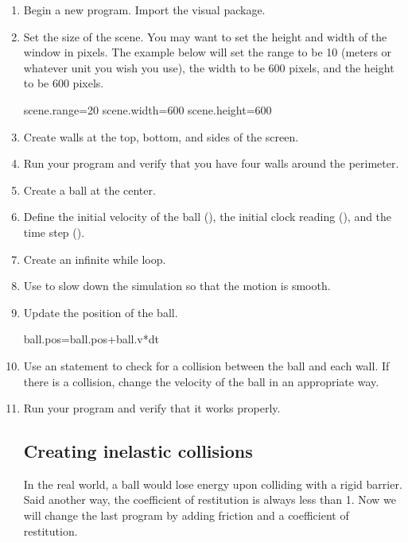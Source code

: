 \begin{enumerate}
\item Begin a new program. Import the visual package.

\item Set the size of the scene. You may want to set the height and width of the window in pixels. The example below will set the range to be 10 (meters or whatever unit you wish you use), the width to be 600 pixels, and the height to be 600 pixels.

\begin{myvpython}
scene.range=20
scene.width=600
scene.height=600
\end{myvpython}

\item Create walls at the top, bottom, and sides of the screen.

\item Run your program and verify that you have four walls around the perimeter.

\item Create a ball at the center.

\item Define the initial velocity of the ball (), the initial clock reading (), and the time step ().

\item Create an infinite while loop.

\item Use  to slow down the simulation so that the motion is smooth.

\item Update the position of the ball.

\begin{myvpython}
    ball.pos=ball.pos+ball.v*dt
\end{myvpython}

\item Use an  statement to check for a collision between the ball and each wall. If there is a collision, change the velocity of the ball in an appropriate way.

\item Run your program and verify that it works properly.

\subsection*{Creating inelastic collisions}

In the real world, a ball would lose energy upon colliding with a rigid barrier. Said another way, the coefficient of restitution is always less than 1. Now we will change the last program by adding friction and a coefficient of restitution.


\end{enumerate}
